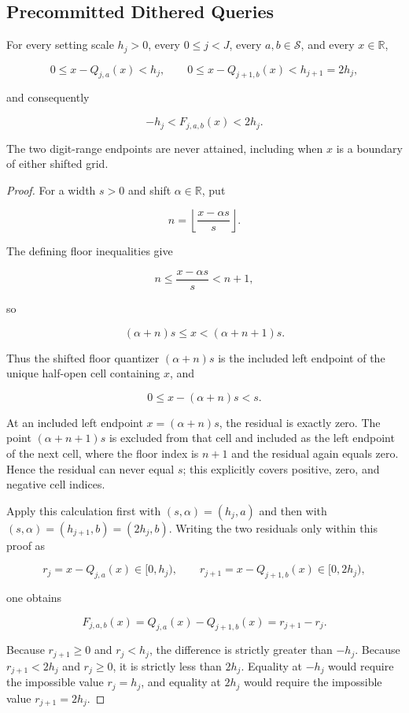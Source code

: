 \subsection{Precommitted Dithered Queries}\label{app:step-005}

\begin{lemma}\label{lem:step-005-digit-range}
For every setting scale \(h_j>0\), every \(0\leq j<J\), every \(a,b\in\mathcal S\), and every \(x\in\mathbb R\),

\[
0\leq x-Q_{j,a}(x)<h_j,
\qquad
0\leq x-Q_{j+1,b}(x)<h_{j+1}=2h_j,
\]

and consequently

\[
-h_j<F_{j,a,b}(x)<2h_j.
\]

The two digit-range endpoints are never attained, including when \(x\) is a boundary of either shifted grid.
\end{lemma}

\begin{proof}
For a width \(s>0\) and shift \(\alpha\in\mathbb R\), put

\[
n=\left\lfloor\frac{x-\alpha s}{s}\right\rfloor.
\]

The defining floor inequalities give

\[
n\leq\frac{x-\alpha s}{s}<n+1,
\]

so

\[
(\alpha+n)s\leq x<(\alpha+n+1)s.
\]

Thus the shifted floor quantizer \((\alpha+n)s\) is the included left endpoint of the unique half-open cell containing \(x\), and

\[
0\leq x-(\alpha+n)s<s.
\]

At an included left endpoint \(x=(\alpha+n)s\), the residual is exactly zero. The point \((\alpha+n+1)s\) is excluded from that cell and included as the left endpoint of the next cell, where the floor index is \(n+1\) and the residual again equals zero. Hence the residual can never equal \(s\); this explicitly covers positive, zero, and negative cell indices.

Apply this calculation first with \((s,\alpha)=(h_j,a)\) and then with \((s,\alpha)=(h_{j+1},b)=(2h_j,b)\). Writing the two residuals only within this proof as

\[
r_j=x-Q_{j,a}(x)\in[0,h_j),
\qquad
r_{j+1}=x-Q_{j+1,b}(x)\in[0,2h_j),
\]

one obtains

\[
F_{j,a,b}(x)
=Q_{j,a}(x)-Q_{j+1,b}(x)
=r_{j+1}-r_j.
\]

Because \(r_{j+1}\geq0\) and \(r_j<h_j\), the difference is strictly greater than \(-h_j\). Because \(r_{j+1}<2h_j\) and \(r_j\geq0\), it is strictly less than \(2h_j\). Equality at \(-h_j\) would require the impossible value \(r_j=h_j\), and equality at \(2h_j\) would require the impossible value \(r_{j+1}=2h_j\).
\end{proof}

